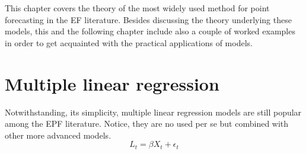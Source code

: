 This chapter covers the theory of the most widely used method for point forecasting in the EF literature. Besides discussing the theory underlying these models, this and the following chapter include also a couple of worked examples in order to get acquainted with the practical applications of models.




\section{Multiple linear regression}
Notwithstanding, its simplicity, multiple linear regression models are still popular among the EPF literature. Notice, they are no used per se but combined with other more advanced models.
\begin{equation}
    L_t=\beta X_t + \epsilon_t
\end{equation}

